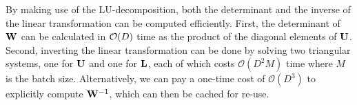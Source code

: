 By making use of the LU-decomposition, both the determinant and the inverse of the linear transformation can be computed efficiently.
First, the determinant of $ \mathbf{W} $ can be calculated in $\mathcal{O}\mathopen{}\left(D\right)\mathclose{}$ time as the product of the diagonal elements of $\mathbf{U}$. 
Second, inverting the linear transformation can be done by solving two triangular systems, one for $\mathbf{U}$ and one for $\mathbf{L}$, each of which costs $ \mathcal{O}(D^{2} M) $ time where $ M $ is the batch size. 
Alternatively, we can pay a one-time cost of $ \mathcal{O}(D^{3}) $ to explicitly compute $ \mathbf{W}^{-1} $, which can then be cached for re-use.
